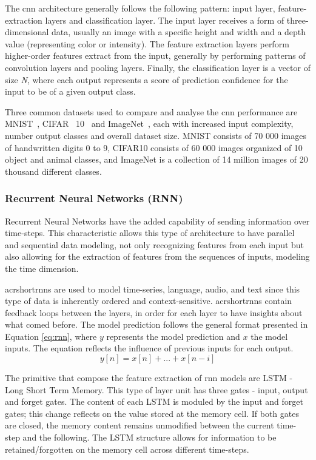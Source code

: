 The \acrshort{cnn} architecture generally follows the following pattern: input layer, feature-extraction layers and classification layer. The input layer receives a form of three-dimensional data, usually an image with a specific height and width and a depth value (representing color or intensity). The feature extraction layers perform higher-order features extract from the input, generally by performing patterns of convolution layers and pooling layers. Finally, the classification layer is a vector of size \textit{N}, where each output represents a score of prediction confidence for the input to be of a given output class.

Three common datasets used to compare and analyse the \acrshort{cnn}  performance are MNIST~\cite{lecun_yann_and_cortes_corinna_mnist_1999}, CIFAR~ 10~\cite{krizhevsky_learning_2009} and ImageNet~\cite{deng_imagenet_2009}, each with increased input complexity, number output classes and overall dataset size. MNIST consists of 70 000 images of handwritten digits 0 to 9, CIFAR10 consists of 60 000 images organized of 10 object and animal classes, and ImageNet is a collection of 14 million images of 20 thousand different classes. 

\subsubsection{Recurrent Neural Networks (RNN)}

Recurrent Neural Networks have the added capability of sending information over time-steps. This characteristic allows this type of architecture to have parallel and sequential data modeling, not only recognizing features from each input but also allowing for the extraction of features from the sequences of inputs, modeling the time dimension. 

acrshort{rnn}s are used to model time-series, language, audio, and text since this type of data is inherently ordered and context-sensitive. acrshort{rnn}s contain feedback loops between the layers, in order for each layer to have insights about what comed before. The model prediction follows the general format presented in Equation \ref{eq:rnn}, where $y$ represents the model prediction and $x$ the model inputs. The equation reflects the influence of previous inputs for each output.
\begin{equation}
    \label{eq:rnn}
    y[n] = x[n] + ... + x[n-i]
\end{equation}

The primitive that compose the feature extraction of \acrshort{rnn} models are LSTM - Long Short Term Memory. This type of layer unit has three gates - input, output and forget gates. The content of each LSTM is moduled by the input and forget gates; this change reflects on the value stored at the memory cell. If both gates are closed, the memory content remains unmodified between the current time-step and the following. The LSTM structure allows for information to be retained/forgotten on the memory cell across different time-steps.


